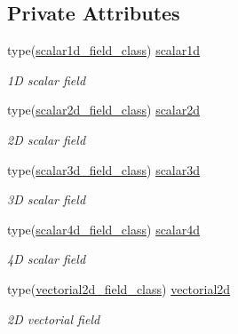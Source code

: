 \subsection*{Private Attributes}
\begin{DoxyCompactItemize}
\item 
type(\mbox{\hyperlink{structfieldtypes__mod_1_1scalar1d__field__class}{scalar1d\+\_\+field\+\_\+class}}) \mbox{\hyperlink{structfieldtypes__mod_1_1generic__field__class_ab28f23e646f7cfe4a42d6dc47a896bf9}{scalar1d}}
\begin{DoxyCompactList}\small\item\em 1D scalar field \end{DoxyCompactList}\item 
type(\mbox{\hyperlink{structfieldtypes__mod_1_1scalar2d__field__class}{scalar2d\+\_\+field\+\_\+class}}) \mbox{\hyperlink{structfieldtypes__mod_1_1generic__field__class_ad4d960a63ab944d31c3a5c7538418d59}{scalar2d}}
\begin{DoxyCompactList}\small\item\em 2D scalar field \end{DoxyCompactList}\item 
type(\mbox{\hyperlink{structfieldtypes__mod_1_1scalar3d__field__class}{scalar3d\+\_\+field\+\_\+class}}) \mbox{\hyperlink{structfieldtypes__mod_1_1generic__field__class_a8ffce3cc5f44742a29d0d9815301f218}{scalar3d}}
\begin{DoxyCompactList}\small\item\em 3D scalar field \end{DoxyCompactList}\item 
type(\mbox{\hyperlink{structfieldtypes__mod_1_1scalar4d__field__class}{scalar4d\+\_\+field\+\_\+class}}) \mbox{\hyperlink{structfieldtypes__mod_1_1generic__field__class_a9e48e8cd99ca98d4d8dd1f40f9002899}{scalar4d}}
\begin{DoxyCompactList}\small\item\em 4D scalar field \end{DoxyCompactList}\item 
type(\mbox{\hyperlink{structfieldtypes__mod_1_1vectorial2d__field__class}{vectorial2d\+\_\+field\+\_\+class}}) \mbox{\hyperlink{structfieldtypes__mod_1_1generic__field__class_a8c04c463fb823576ae29de240eb209f5}{vectorial2d}}
\begin{DoxyCompactList}\small\item\em 2D vectorial field \end{DoxyCompactList}\item 

\end{DoxyCompactItemize}
